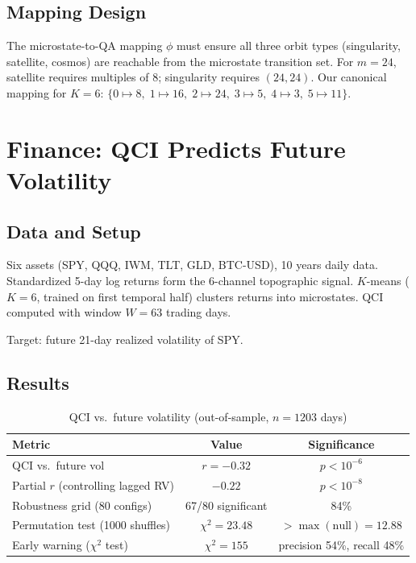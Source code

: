 \documentclass[11pt,a4paper]{article}
\begin{document}
\subsection{Mapping Design}

The microstate-to-QA mapping $\phi$ must ensure all three orbit types
(singularity, satellite, cosmos) are reachable from the microstate transition
set. For $m = 24$, satellite requires multiples of 8; singularity requires
$(24,24)$. Our canonical mapping for $K=6$:
$\{0 \mapsto 8,\; 1 \mapsto 16,\; 2 \mapsto 24,\; 3 \mapsto 5,\;
4 \mapsto 3,\; 5 \mapsto 11\}$.

\section{Finance: QCI Predicts Future Volatility}
\label{sec:finance}

\subsection{Data and Setup}

Six assets (SPY, QQQ, IWM, TLT, GLD, BTC-USD), 10 years daily data.
Standardized 5-day log returns form the 6-channel topographic signal.
$K$-means ($K=6$, trained on first temporal half) clusters returns into
microstates. QCI computed with window $W=63$ trading days.

Target: future 21-day realized volatility of SPY.

\subsection{Results}

\begin{table}[h]
\centering
\caption{QCI vs.\ future volatility (out-of-sample, $n = 1203$ days)}
\begin{tabular}{lcc}
\toprule
Metric & Value & Significance \\
\midrule
QCI vs.\ future vol & $r = -0.32$ & $p < 10^{-6}$ \\
Partial $r$ (controlling lagged RV) & $-0.22$ & $p < 10^{-8}$ \\
Robustness grid (80 configs) & 67/80 significant & 84\% \\
Permutation test (1000 shuffles) & $\chi^2 = 23.48$ & $> \max(\text{null}) = 12.88$ \\
Early warning ($\chi^2$ test) & $\chi^2 = 155$ & precision 54\%, recall 48\% \\
\bottomrule
\end{tabular}
\end{table}
\end{document}
